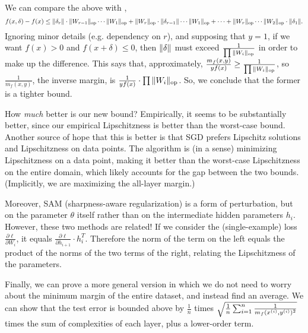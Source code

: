 We can compare the above with \cite{bartlett2017},
\begin{equation}
f(x, \delta) - f(x) \leq \norm{\delta_r} \cdot \norm{W_{r-1}}_{\text{op}} \cdots \norm{W_1}_{\text{op}} + \norm{W_r}_{\text{op}} \cdot \norm{\delta_{r-1}} \cdots \norm{W_1}_{\text{op}} + \cdots + \norm{W_r}_{\text{op}} \cdots \norm{W_2}_{\text{op}} \cdot \norm{\delta_1}.
\end{equation}
Ignoring minor details (e.g. dependency on $r$), and supposing that $y = 1$, if we want $f(x) > 0$ and $f(x + \delta) \leq 0$, then $\norm{\delta}$ must exceed $\frac{1}{\prod\norm{W_i}_{\text{op}}}$ in order to make up the difference. This says that, approximately, $\frac{m_f(x, y)}{y f(x)} \geq \frac{1}{\prod \norm{W_i}_{\text{op}}}$, so $\frac{1}{m_f(x, y)}$, the inverse margin, is $\frac{1}{yf(x)} \cdot \prod \norm{W_i}_{\text{op}}$. So, we conclude that the former is a tighter bound.

How \textit{much} better is our new bound? Empirically, it seems to be substantially better, since our empirical Lipschitzness is better than the worst-case bound. Another source of hope that this is better is that SGD prefers Lipschitz solutions and Lipschitzness on data points. The algorithm is (in a sense) minimizing Lipschitzness on a data point, making it better than the worst-case Lipschitzness on the entire domain, which likely accounts for the gap between the two bounds. (Implicitly, we are maximizing the all-layer margin.)

Moreover, SAM (sharpness-aware regularization) is a form of perturbation, but on the parameter $\theta$ itself rather than on the intermediate hidden parameters $h_i$. However, these two methods are related! If we consider the (single-example) loss $\frac{\partial \ell}{\partial W_i}$, it equals $\frac{\partial \ell}{\partial h_{i+1}} \cdot h_i^T$. Therefore the norm of the term on the left equals the product of the norms of the two terms of the right, relating the Lipschitzness of the parameters.

Finally, we can prove a more general version in which we do not need to worry about the minimum margin of the entire dataset, and instead find an average. We can show that the test error is bounded above by $\frac{1}{n}$ times $\sqrt{\frac{1}{n} \sum_{i=1}^n \frac{1}{m_f(x\sp{i}, y\sp{i})^2}}$ times the sum of complexities of each layer, plus a lower-order term.

